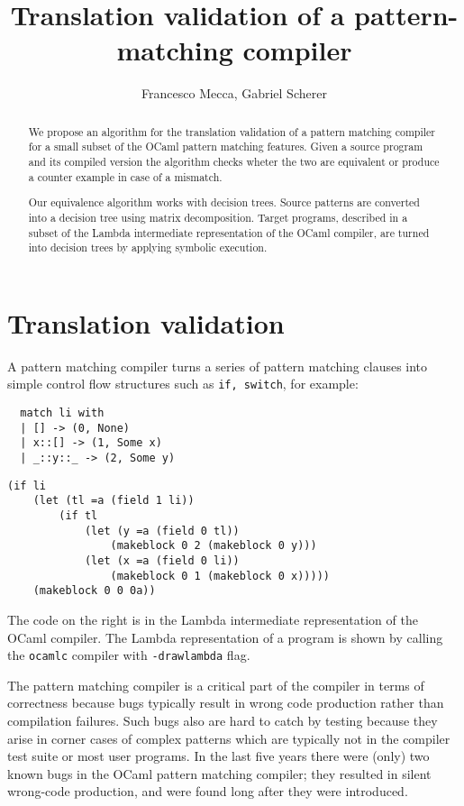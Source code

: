 \documentclass[12pt]{article}
\title{Translation validation of a pattern-matching compiler}
\author{Francesco Mecca, Gabriel Scherer}
\begin{document}
\maketitle

\begin{abstract}
We propose an algorithm for the translation validation of a pattern
matching compiler for a small subset of the OCaml pattern
matching features. Given a source program and its compiled version the
algorithm checks wheter the two are equivalent or produce a counter
example in case of a mismatch.

Our equivalence algorithm works with decision trees. Source patterns are
converted into a decision tree using matrix decomposition.
Target programs, described in a subset of the Lambda intermediate
representation of the OCaml compiler, are turned into decision trees
by applying symbolic execution.
\end{abstract}
\section{Translation validation}
A pattern matching compiler turns a series of pattern matching clauses
into simple control flow structures such as \texttt{if, switch}, for example:

\hspace{-3em}
\begin{minipage}{0.4\linewidth}
\begin{lstlisting}
  match li with
  | [] -> (0, None)
  | x::[] -> (1, Some x)
  | _::y::_ -> (2, Some y)
\end{lstlisting}
\end{minipage}
\hfill
\begin{minipage}{0.6\linewidth}
\begin{lstlisting}
(if li
    (let (tl =a (field 1 li))
        (if tl
            (let (y =a (field 0 tl))
                (makeblock 0 2 (makeblock 0 y)))
            (let (x =a (field 0 li))
                (makeblock 0 1 (makeblock 0 x)))))
    (makeblock 0 0 0a))
\end{lstlisting}
\end{minipage}

The code on the right is in the Lambda intermediate representation of
the OCaml compiler. The Lambda representation of a program is shown by
calling the \texttt{ocamlc} compiler with \texttt{-drawlambda} flag.

The pattern matching compiler is a critical part of the compiler
in terms of correctness because bugs typically result in wrong code
production rather than compilation failures.
Such bugs also are hard to catch by testing because they arise in
corner cases of complex patterns which are typically not in the
compiler test suite or most user programs.
In the last five years there were (only) two known bugs in the OCaml pattern
matching compiler; they resulted in silent wrong-code production,
and were found long after they were introduced.
\end{document}
